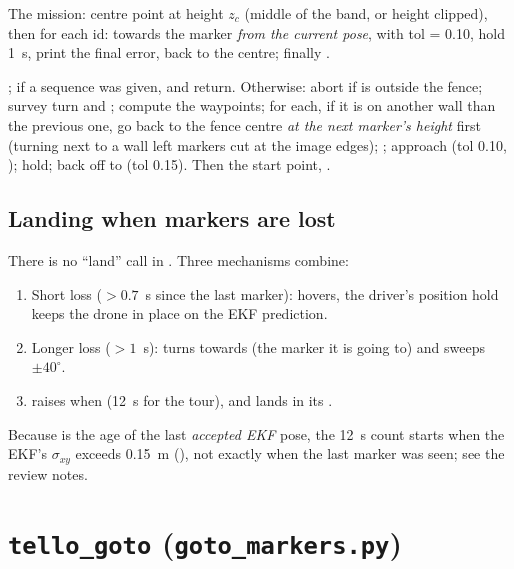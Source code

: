 The  mission: centre point at height $z_c$ (middle of the band, or  height clipped),
then for each id:  towards the marker \emph{from the current pose}, 
with tol = 0.10, hold 1~s, print the final error,  back to the centre; finally
.

; if a sequence was given,  and return. Otherwise: abort if  is
outside the fence; survey turn and ; compute the waypoints; for each, if it is on another wall
than the previous one, go back to the fence centre \emph{at the next marker's height} first (turning next to a
wall left markers cut at the image edges); ; approach (tol 0.10, ); hold; back
off to  (tol 0.15). Then  the start point, .

\subsection{Landing when markers are lost}

There is no ``land'' call in . Three mechanisms combine:
\begin{enumerate}[nosep]
  \item Short loss ($>0.7$~s since the last marker):  hovers, the driver's position hold keeps the
        drone in place on the EKF prediction.
  \item Longer loss ($>1$~s):  turns towards  (the marker it is going to) and sweeps
        $\pm40^\circ$.
  \item {} raises  when  (12~s for the tour),
        and  lands in its .
\end{enumerate}
Because  is the age of the last \emph{accepted EKF} pose, the 12~s count starts when the EKF's
$\sigma_{xy}$ exceeds 0.15~m (), not exactly when the last marker was seen; see the
review notes.

\section{\texorpdfstring{\texttt{tello\_goto}}{tello\_goto} (\texorpdfstring{\texttt{goto\_markers.py}}{goto\_markers.py})}


